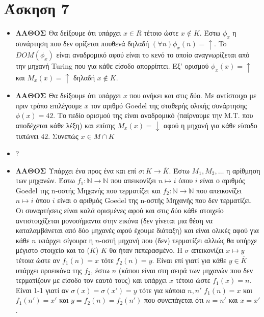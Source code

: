 \documentclass[11pt]{article}
\begin{document}
\section*{Άσκηση 7}
\begin{itemize}
  \item \textbf{ΛΑΘΟΣ} Θα δείξουμε ότι υπάρχει $x\in R$ τέτοιο ώστε $x\notin K$. Έστω
    $\phi_x$ η συνάρτηση που δεν ορίζεται πουθενά δηλαδή $(\forall n)\phi_x(n)=\uparrow$. To 
    $DOM(\phi_x)$ είναι αναδρομικό αφού είναι το κενό το οποίο αναγνωρίζεται από την μηχανή
    Turing που για κάθε είσοδο απορρίπτει. Εξ' ορισμού $\phi_x(x)=\uparrow$ και $M_x(x)=\uparrow$
    δηλαδή $x\notin K$.
  \item \textbf{ΛΑΘΟΣ} Θα δείξουμε ότι υπάρχει $x$ που ανήκει και στις δύο. Με αντίστοιχο με πριν
    τρόπο επιλέγουμε $x$ τον αριθμό Goedel της σταθερής ολικής συνάρτησης $\phi(x)=42$. Το πεδίο
    ορισμού της είναι αναδρομικό (παίρνουμε την Μ.T. που αποδέχεται κάθε λέξη) και επίσης $M_x(x)=\downarrow$
    αφού η μηχανή για κάθε είσοδο τυπώνει $42$. Συνεπώς $x\in M\cap K$ 
  \item ?
  \item \textbf{ΛΑΘΟΣ} Υπάρχει ένα προς ένα και επί $\sigma:K\rightarrow\overline{K}$. Έστω $M_1,M_2,\ldots$
    η αρίθμηση των μηχανών. Έστω $f_1:\mathbb{N}\rightarrow \mathbb{N}$ που απεικονίζει $n\mapsto i$ όπου $i$ είναι 
    ο αριθμός Goedel της n-οστής Μηχανής που τερματίζει και $f_2:\mathbb{N}\rightarrow \mathbb{N}$ που απεικονίζει
    $n\mapsto i$ όπου $i$ είναι ο αριθμός Goedel της n-οστής Μηχανής που δεν τερματίζει. Οι συναρτήσεις είναι καλά
    ορισμένες αφού και στις δύο κάθε στοιχείο αντιστοιχίζεται μονοσήμαντα στην εικόνα (δεν γίνεται μια θέση να 
    καταλαμβάνεται από δύο μηχανές αφού έχουμε διάταξη)
    και είναι ολικές αφού για κάθε $n$ υπάρχει σίγουρα η $n$-οστή μηχανή που (δεν)
    τερματίζει αλλιώς θα υπήρχε μέγιστο στοιχείο και το ($\overline{K}$) $K$ θα ήταν πεπερασμένο. 
    Η $\sigma$ απεικονίζει $x\mapsto y$ τέτοια ώστε αν $f_1(n)=x$ τότε $f_2(n)=y$. Είναι επί γιατί για κάθε 
    $y\in\overline{K}$ υπάρχει προεικόνα της $f_2$, έστω $n$ (κάπου είναι στη σειρά των μηχανών που δεν τερματίζουν με είσοδο τον
    εαυτό τους) και υπάρχει $x$ τέτοιο ώστε $f_1(x) = n$. Είναι 1-1 γιατί αν $\sigma(x)=\sigma(x')=y$ τότε για κάποια $n,n'$ 
    $f_1(n)=x$ και $f_1(n')=x'$ και $y=f_2(n)=f_2(n')$ που συνεπάγεται ότι $n=n'$ και $x=x'$.
\end{itemize}

\end{document}
